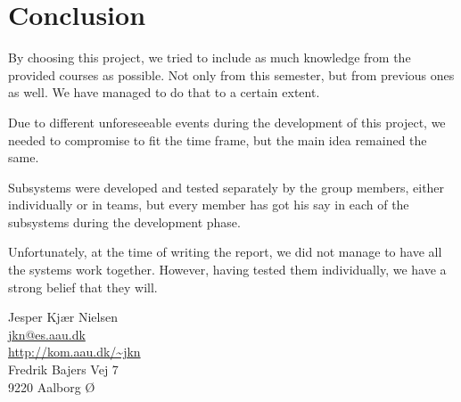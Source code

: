 \chapter{Conclusion}\label{ch:conclusion}

By choosing this project, we tried to include as much knowledge from the provided 
courses as possible. Not only from this semester, but from previous ones as well. 
We have managed to do that to a certain extent. 

Due to different unforeseeable events during the development of this project, we 
needed to compromise to fit the time frame, but the main idea 
remained the same. 

Subsystems were developed and tested separately by the group members, either 
individually or in teams, but every member has got his say in each of the 
subsystems during the development phase.

Unfortunately, at the time of writing the report, we did not manage to have all the systems work together. However, having tested them individually, we have a strong belief that they will.

  \begin{center}
    Jesper Kjær Nielsen\\
    \href{mailto: jkn@es.aau.dk}{jkn@es.aau.dk}\\
    \href{http://kom.aau.dk/~jkn}{http://kom.aau.dk/\textasciitilde jkn}\\
    Fredrik Bajers Vej 7\\
    9220 Aalborg Ø
  \end{center}